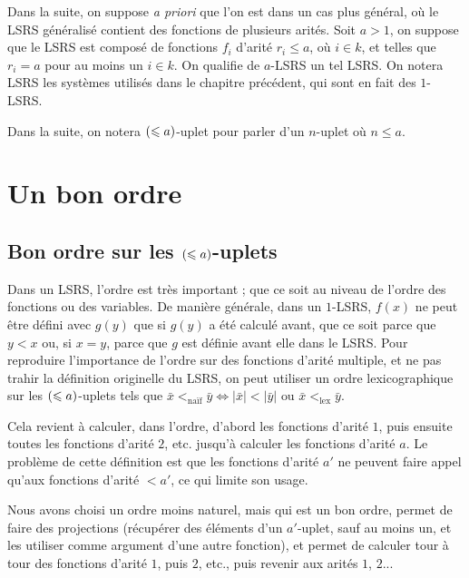 		Dans la suite, on suppose \emph{a priori} que l'on est dans un cas plus général, où le LSRS généralisé contient des fonctions de plusieurs arités. Soit $a>1$, on suppose que le LSRS est composé de fonctions $f_i$ d'arité $r_i \leqslant a$, où $i \in k$, et telles que $r_i = a$ pour au moins un $i\in k$. On qualifie de $a$-LSRS un tel LSRS. On notera LSRS les systèmes utilisés dans le chapitre précédent, qui sont en fait des $1$-LSRS. 
		
		Dans la suite, on notera $\left( \leqslant a \right)$-uplet pour parler d'un $n$-uplet où $n\leqslant a$. 
	
	
	\section{Un bon ordre} %
	\label{sec:ennuis_commencent}
	
		
		\subsection{Bon ordre sur les $\left( \leqslant a \right)$-uplets}
		\label{subsec:bon_ordre_uplets}
		
		Dans un LSRS, l'ordre est très important ; que ce soit au niveau de l'ordre des fonctions ou des variables. De manière générale, dans un $1$-LSRS, $f(x)$ ne peut être défini avec $g(y)$ que si $g(y)$ a été calculé avant, que ce soit parce que $y<x$ ou, si $x=y$, parce que $g$ est définie avant elle dans le LSRS. 
		Pour reproduire l'importance de l'ordre sur des fonctions d'arité multiple, et ne pas trahir la définition originelle du LSRS, on peut utiliser un ordre lexicographique sur les $\left( \leqslant a \right)$-uplets tels que $\bar{x} <_{\text{naïf}} \bar{y} \Leftrightarrow \left|\bar{x}\right| < \left|\bar{y}\right| \text{ ou } \bar{x} <_{\text{lex}} \bar{y}$. 
			
		Cela revient à calculer, dans l'ordre, d'abord les fonctions d'arité $1$, puis ensuite toutes les fonctions d'arité $2$, etc. jusqu'à calculer les fonctions d'arité $a$. Le problème de cette définition est que les fonctions d'arité $a'$ ne peuvent faire appel qu'aux fonctions d'arité $<a'$, ce qui limite son usage.
		
		Nous avons choisi un ordre moins naturel, mais qui est un bon ordre, permet de faire des projections (récupérer des éléments d'un $a'$-uplet, sauf au moins un, et les utiliser comme argument d'une autre fonction), et permet de calculer tour à tour des fonctions d'arité $1$, puis $2$, etc., puis revenir aux arités $1$, $2$...
		
